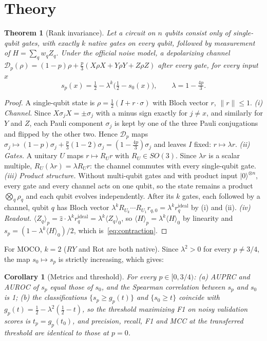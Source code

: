\documentclass[10pt,twocolumn]{article}
\newtheorem{theorem}{Theorem}
\newtheorem{corollary}{Corollary}
\theoremstyle{definition}
\newcommand{\ex}[1]{\langle #1\rangle}
\begin{document}
\section{Theory}

\begin{theorem}[Rank invariance]\label{thm:rank}
Let a circuit on $n$ qubits consist only of single-qubit gates, with exactly $k$ native gates on every qubit,
followed by measurement of $H=\sum_q w_q Z_q$. Under the official noise model, a depolarizing channel
$\mathcal D_p(\rho)=(1-p)\rho+\tfrac p3(X\rho X+Y\rho Y+Z\rho Z)$ after every gate, for every input $x$
\begin{equation}
s_p(x)=\tfrac12-\lambda^{k}\big(\tfrac12-s_0(x)\big),\qquad \lambda=1-\tfrac{4p}{3}.
\label{eq:contraction}
\end{equation}
\end{theorem}

\begin{proof}
A single-qubit state is $\rho=\tfrac12(I+r\cdot\sigma)$ with Bloch vector $r$, $\lVert r\rVert\le1$.
\emph{(i) Channel.} Since $X\sigma_jX=\pm\sigma_j$ with a minus sign exactly for $j\ne x$, and similarly for $Y$
and $Z$, each Pauli component $\sigma_j$ is kept by one of the three Pauli conjugations and flipped by the other
two. Hence $\mathcal D_p$ maps $\sigma_j\mapsto(1-p)\sigma_j+\tfrac p3(1-2)\sigma_j=(1-\tfrac{4p}3)\sigma_j$ and
leaves $I$ fixed: $r\mapsto\lambda r$.
\emph{(ii) Gates.} A unitary $U$ maps $r\mapsto R_U r$ with $R_U\in SO(3)$. Since $\lambda r$ is a scalar
multiple, $R_U(\lambda r)=\lambda R_U r$: the channel commutes with every single-qubit gate.
\emph{(iii) Product structure.} Without multi-qubit gates and with product input $\lvert0\rangle^{\otimes n}$,
every gate and every channel acts on one qubit, so the state remains a product $\bigotimes_q\rho_q$ and each
qubit evolves independently. After its $k$ gates, each followed by a channel, qubit $q$ has Bloch vector
$\lambda^k R_{U_k}\cdots R_{U_1}r_{q,0}=\lambda^k r_q^{\mathrm{ideal}}$ by (i) and (ii).
\emph{(iv) Readout.} $\ex{Z_q}_p=\hat z\cdot\lambda^k r_q^{\mathrm{ideal}}=\lambda^k\ex{Z_q}_0$, so
$\ex{H}_p=\lambda^k\ex{H}_0$ by linearity and $s_p=(1-\lambda^k\ex{H}_0)/2$, which is~\eqref{eq:contraction}.
\end{proof}

For MOCO, $k=2$ ($RY$ and $\mathrm{Rot}$ are both native). Since $\lambda^2>0$ for every $p\ne3/4$, the map
$s_0\mapsto s_p$ is strictly increasing, which gives:

\begin{corollary}[Metrics and threshold]\label{cor:metrics}
For every $p\in[0,3/4)$: (a) AUPRC and AUROC of $s_p$ equal those of $s_0$, and the Spearman correlation between
$s_p$ and $s_0$ is 1; (b) the classifications $\{s_p\ge g_p(t)\}$ and $\{s_0\ge t\}$ coincide with
$g_p(t)=\tfrac12-\lambda^2(\tfrac12-t)$, so the threshold maximizing F1 on noisy validation scores is
$t_p=g_p(t_0)$, and precision, recall, F1 and MCC at the transferred threshold are identical to those at $p=0$.
\end{corollary}
\end{document}
